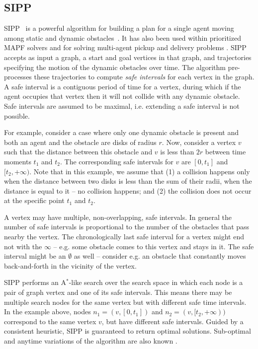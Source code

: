 \documentclass[review]{elsarticle}
\newcommand{\sipp}{\ac{SIPP}\xspace}
\newcommand{\astar}{A$^*$\xspace}
\newcommand{\mapf}{\ac{MAPF}\xspace}
\begin{document}
\subsection{\sipp}
\sipp~\cite{phillips2011sipp} is a powerful algorithm for building a plan for a single agent moving among static and dynamic obstacles~\cite{phillips2011sipp}. 
It has also been used within prioritized \mapf solvers \cite{yakovlev2017anyAngle} and for solving multi-agent pickup and delivery problems \cite{ma2019lifelong}. 
\sipp accepts as input a graph, a start and goal vertices in that graph, and trajectories specifying the motion of the dynamic obstacles over time. 
The algorithm pre-processes these trajectories to compute \emph{safe intervals} for each vertex in the graph. 
A safe interval is a contiguous period of time for a vertex, during which if the agent occupies that vertex then it will not collide with any dynamic obstacle. 
Safe intervals are assumed to be maximal, i.e. extending a safe interval is not possible.

For example, consider a case where only one dynamic obstacle is present and both an agent and the obstacle are disks of radius $r$.
Now, consider a vertex $v$ such that the distance between this obstacle and $v$ is less than $2r$ between time moments $t_1$ and $t_2$. The corresponding safe intervals for $v$ are $[0, t_1]$ and $[t_2, +\infty)$.
Note that in this example, we assume that (1) a collision happens only when the distance between two disks is less than the sum of their radii, when the distance is equal to it -- no collision happens; and (2) the collision does not occur at the specific point $t_1$ and $t_2$.

A vertex may have multiple, non-overlapping, safe intervals. 
In general the number of safe intervals is proportional to the number of the obstacles that pass nearby the vertex. The chronologically last safe interval for a vertex might end not with the $\infty$ -- e.g. some obstacle comes to this vertex and stays in it. The safe interval might be an $\emptyset$ as well -- consider e.g. an obstacle that constantly moves back-and-forth in the vicinity of the vertex. 



\sipp performs an \astar-like search over the search space in which each node is a pair of graph vertex and one of its safe intervals. This means there may be multiple search nodes for the same vertex but with different safe time intervals. In the example above, nodes
$n_1=(v, [0, t_1])$ and $n_2=(v, [t_2, +\infty) )$ 
correspond to the same vertex $v$, but have different safe intervals.
Guided by a consistent heuristic, \sipp is guaranteed to return optimal solutions. 
Sub-optimal and anytime variations of the algorithm are also known \cite{narayanan2012anytime,yakovlev2020revisiting}. %
\end{document}
